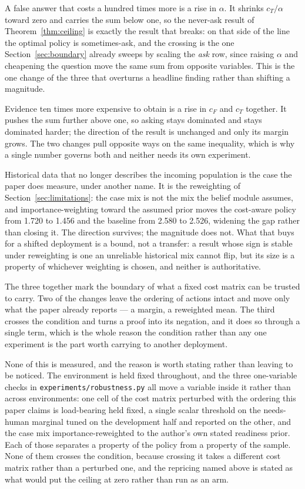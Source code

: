 \documentclass{article}
\begin{document}
A false answer that costs a hundred times more is a rise in $\alpha$. It shrinks
$c_T/\alpha$ toward zero and carries the sum below one, so the never-ask result of
Theorem~\ref{thm:ceiling} is exactly the result that breaks: on that side of the
line the optimal policy is sometimes-ask, and the crossing is the one
Section~\ref{sec:boundary} already sweeps by scaling the \emph{ask} row, since
raising $\alpha$ and cheapening the question move the same sum from opposite
variables. This is the one change of the three that overturns a headline finding
rather than shifting a magnitude.

Evidence ten times more expensive to obtain is a rise in $c_F$ and $c_T$ together.
It pushes the sum further above one, so asking stays dominated and stays dominated
harder; the direction of the result is unchanged and only its margin grows. The two
changes pull opposite ways on the same inequality, which is why a single number
governs both and neither needs its own experiment.

Historical data that no longer describes the incoming population is the case the
paper does measure, under another name. It is the reweighting of
Section~\ref{sec:limitations}: the case mix is not the mix the belief module
assumes, and importance-weighting toward the assumed prior moves the cost-aware
policy from 1.720 to 1.456 and the baseline from 2.580 to 2.526, widening the gap
rather than closing it. The direction survives; the magnitude does not. What that
buys for a shifted deployment is a bound, not a transfer: a result whose sign is
stable under reweighting is one an unreliable historical mix cannot flip, but its
size is a property of whichever weighting is chosen, and neither is authoritative.

The three together mark the boundary of what a fixed cost matrix can be trusted to
carry. Two of the changes leave the ordering of actions intact and move only what
the paper already reports --- a margin, a reweighted mean. The third crosses the
condition and turns a proof into its negation, and it does so through a single term,
which is the whole reason the condition rather than any one experiment is the part
worth carrying to another deployment.

None of this is measured, and the reason is worth stating rather than leaving to be
noticed. The environment is held fixed throughout, and the three one-variable checks
in \texttt{experiments/robustness.py} all move a variable inside it rather than
across environments: one cell of the cost matrix perturbed with the ordering this
paper claims is load-bearing held fixed, a single scalar threshold on the
needs-human marginal tuned on the development half and reported on the other, and
the case mix importance-reweighted to the author's own stated readiness prior. Each
of those separates a property of the policy from a property of the sample. None of
them crosses the condition, because crossing it takes a different cost matrix rather
than a perturbed one, and the repricing named above is stated as what would put the
ceiling at zero rather than run as an arm.
\end{document}
